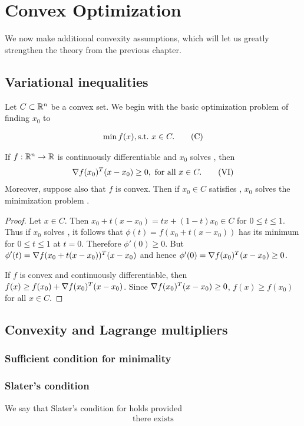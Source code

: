 \setchapterpreamble[u]{\margintoc}
\chapter{Convex Optimization}

We now make additional convexity assumptions, which will let us greatly
strengthen the theory from the previous chapter.

\section{Variational inequalities}

Let $C \subset \mathbb{R}^n$ be a convex set.
We begin with the basic optimization problem of finding $x_0$ to

\begin{align}
    \min f(x), \mathrm{s.t. \ } x \in C. \tag{C}
\end{align}

\begin{theorem}
    If $f: \mathbb{R}^n \to \mathbb{R}$ is continuously differentiable and $x_0$ solves , then 
    \begin{align}
        \nabla f(x_0)^T (x-x_0) \ge 0, \text{ for all } x \in C. \tag{VI}
    \end{align}
    Moreover, suppose also that $f$ is convex.
    Then if $x_0 \in C$ satisfies , $x_0$ solves the minimization problem .
\end{theorem}

\begin{proof}
    Let $x \in C$.
    Then $x_0 + t(x - x_0) = t x + (1-t) x_0 \in C$ for $0 \le t \le 1$.
    Thus if $x_0$ solves , it follows that $\phi(t) = f(x_0 + t(x - x_0))$ has its minimum for $0 \le t \le 1$ at $t = 0$.
    Therefore $\phi'(0) \ge 0$.
    But $\phi'(t) = \nabla f(x_0 + t(x - x_0))^T (x-x_0)$ and hence $\phi'(0) = \nabla f(x_0)^T (x-x_0) \ge 0$.
    
    If $f$ is convex and continuously differentiable, then $f(x) \ge f(x_0) + \nabla f(x_0)^T (x-x_0)$.
    Since $\nabla f(x_0)^T (x-x_0) \ge 0$, $f(x) \ge f(x_0)$ for all $x \in C$.
\end{proof}

\section{Convexity and Lagrange multipliers}

\subsection{Sufficient condition for minimality}

\subsection{Slater's condition}

\begin{definition}
    We say that Slater's condition for holds provided
    \begin{align}
        \text{there exists}
    \end{align}
\end{definition}
